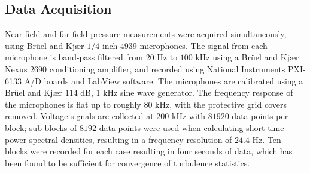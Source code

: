 \documentclass[english]{aiaa-tc}
\begin{document}
\subsection{Data Acquisition}
Near-field and far-field pressure measurements were acquired simultaneously, using Br\"{u}el and Kj{\ae}r $1/4$ inch 4939 microphones. The signal from each microphone is band-pass filtered from $20$ Hz to $100$ kHz using a Br\"{u}el and Kj{\ae}r Nexus $2690$ conditioning amplifier, and recorded using National Instruments PXI-6133 A/D boards and LabView software. The microphones are calibrated using a Br\"{u}el and Kj{\ae}r $114$ dB, $1$ kHz sine wave generator. The frequency response of the microphones is flat up to roughly 80 kHz, with the protective grid covers removed. Voltage signals are collected at $200$ kHz with $81920$ data points per block; sub-blocks of $8192$ data points were used when calculating short-time power spectral densities, resulting in a frequency resolution of $24.4$ Hz. Ten blocks were recorded for each case resulting in four seconds of data, which has been found to be sufficient for convergence of turbulence statistics.	
\end{document}
